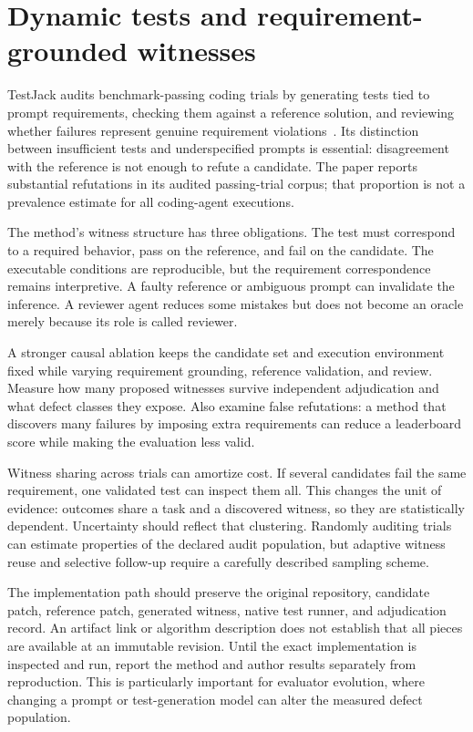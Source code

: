 \section{Dynamic tests and requirement-grounded witnesses}\label{sec:C25:testjack}
TestJack audits benchmark-passing coding trials by generating tests tied to prompt requirements, checking them against a reference solution, and reviewing whether failures represent genuine requirement violations~\cite{yao2026testjack}. Its distinction between insufficient tests and underspecified prompts is essential: disagreement with the reference is not enough to refute a candidate. The paper reports substantial refutations in its audited passing-trial corpus; that proportion is not a prevalence estimate for all coding-agent executions.

The method's witness structure has three obligations. The test must correspond to a required behavior, pass on the reference, and fail on the candidate. The executable conditions are reproducible, but the requirement correspondence remains interpretive. A faulty reference or ambiguous prompt can invalidate the inference. A reviewer agent reduces some mistakes but does not become an oracle merely because its role is called reviewer.

A stronger causal ablation keeps the candidate set and execution environment fixed while varying requirement grounding, reference validation, and review. Measure how many proposed witnesses survive independent adjudication and what defect classes they expose. Also examine false refutations: a method that discovers many failures by imposing extra requirements can reduce a leaderboard score while making the evaluation less valid.

Witness sharing across trials can amortize cost. If several candidates fail the same requirement, one validated test can inspect them all. This changes the unit of evidence: outcomes share a task and a discovered witness, so they are statistically dependent. Uncertainty should reflect that clustering. Randomly auditing trials can estimate properties of the declared audit population, but adaptive witness reuse and selective follow-up require a carefully described sampling scheme.

The implementation path should preserve the original repository, candidate patch, reference patch, generated witness, native test runner, and adjudication record. An artifact link or algorithm description does not establish that all pieces are available at an immutable revision. Until the exact implementation is inspected and run, report the method and author results separately from reproduction. This is particularly important for evaluator evolution, where changing a prompt or test-generation model can alter the measured defect population.


